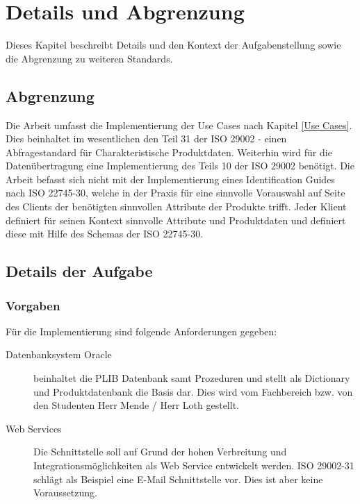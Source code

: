 \section{Details und Abgrenzung}

Dieses Kapitel beschreibt Details und den Kontext der Aufgabenstellung sowie die Abgrenzung zu weiteren Standards.

\subsection{Abgrenzung}

Die Arbeit umfasst die Implementierung der Use Cases nach Kapitel \ref{Use Cases}. Dies beinhaltet im wesentlichen den Teil 31 der ISO 29002 - einen Abfragestandard für Charakteristische Produktdaten. Weiterhin wird für die Datenübertragung eine Implementierung des Teils 10 der ISO 29002 benötigt. Die Arbeit befasst sich nicht mit der Implementierung eines Identification Guides nach ISO 22745-30, welche in der Praxis für eine sinnvolle Vorauswahl auf Seite des Clients der benötigten sinnvollen Attribute der Produkte trifft. Jeder Klient definiert für seinen Kontext sinnvolle Attribute und Produktdaten und definiert diese mit Hilfe des Schemas der ISO 22745-30. 

\subsection{Details der Aufgabe}

\subsubsection{Vorgaben}

Für die Implementierung sind folgende Anforderungen gegeben:
\begin{description}
\item[Datenbanksystem Oracle] beinhaltet die PLIB Datenbank samt Prozeduren und stellt als Dictionary und Produktdatenbank die Basis dar. Dies wird vom Fachbereich bzw. von den Studenten Herr Mende / Herr Loth gestellt. 
\item[Web Services] Die Schnittstelle soll auf Grund der hohen Verbreitung und Integrationsmöglichkeiten als Web Service entwickelt werden. ISO 29002-31 schlägt als Beispiel eine E-Mail Schnittstelle vor.  Dies ist aber keine Voraussetzung. 
\end{description}


